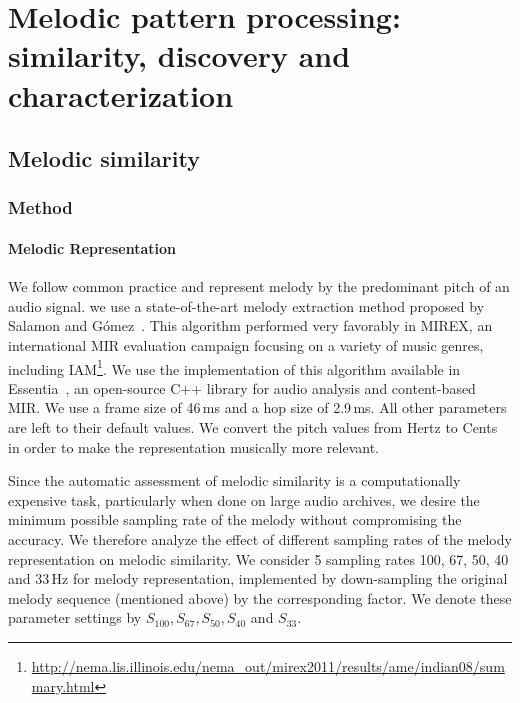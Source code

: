 
\chapter{Melodic pattern processing: similarity, discovery and characterization}
\label{chap:melodic_pattern_processing}

\section{Melodic similarity}

\subsection{Method}
\subsubsection{Melodic Representation}

We follow common practice and represent melody by the predominant pitch of an audio signal.  we use a state-of-the-art melody extraction method proposed by Salamon and G\'omez~\cite{Salamon2012}. This algorithm performed very favorably in MIREX, an international MIR evaluation campaign focusing on a variety of music genres, including IAM\footnote{\url{http://nema.lis.illinois.edu/nema_out/mirex2011/results/ame/indian08/summary.html}}. We use the implementation of this algorithm available in Essentia~\cite{essentia}, an open-source C++ library for audio analysis and content-based MIR. We use a frame size of 46\,ms and a hop size of 2.9\,ms. All other parameters are left to their default values.  We convert the pitch values from Hertz to Cents in order to make the representation musically more relevant.

Since the automatic assessment of melodic similarity is a computationally expensive task, particularly when done on large audio archives, we desire the minimum possible sampling rate of the melody without compromising the accuracy. We therefore analyze the effect of different sampling rates of the melody representation on melodic similarity. We consider 5 sampling rates 100, 67, 50, 40 and 33\,Hz for melody representation, implemented by down-sampling the original melody sequence (mentioned above) by the corresponding factor. We denote these parameter settings by $S_{100}, S_{67}, S_{50}, S_{40}$ and $S_{33}$.

